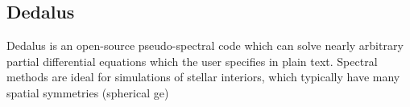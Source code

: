 {\color{purple}    
\subsection{Dedalus}}

Dedalus is an open-source pseudo-spectral code which can solve nearly arbitrary partial differential equations which the user specifies in plain text. Spectral methods are ideal for simulations of stellar interiors, which typically have many spatial symmetries (spherical ge) 
